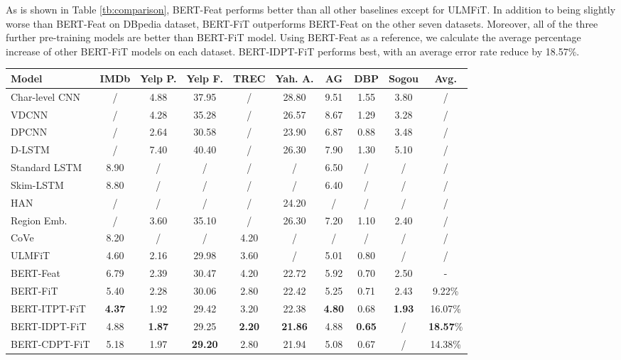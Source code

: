 \documentclass[11pt,a4paper]{article}
\theoremstyle{definition}
\begin{document}
\begin{CJK*}{UTF8}{gbsn}
	As is shown in Table \ref{tb:comparison}, BERT-Feat performs better than all other baselines except for ULMFiT. In addition to being slightly worse than BERT-Feat on DBpedia dataset, BERT-FiT outperforms BERT-Feat on the other seven datasets.
	Moreover, all of the three further pre-training models are better than BERT-FiT model. Using BERT-Feat as a reference, we calculate the average percentage increase of other BERT-FiT models on each dataset. BERT-IDPT-FiT performs best, with an average error rate reduce by 18.57\%.

	

\begin{table*}[h!]\small\setlength{\tabcolsep}{6pt}
		\centering
		\begin{tabular}{l c c c c c c c c c }
			\toprule
			Model & IMDb & Yelp P. & Yelp F. & TREC & Yah. A. & AG & DBP & Sogou & Avg.  \\
			\midrule
			Char-level CNN\cite{zhang2015character} & / & 4.88 & 37.95 & / & 28.80 & 9.51 & 1.55 & 3.80 & / \\
			VDCNN \cite{conneau2016very} & / & 4.28 & 35.28 & / & 26.57 & 8.67 & 1.29 & 3.28 & / \\
			DPCNN \cite{johnson2017deep} & / & 2.64 & 30.58 & / & 23.90 & 6.87 & 0.88 & 3.48 & / \\
			\midrule	
			D-LSTM \cite{yogatama2017generative} & / & 7.40 & 40.40 & / & 26.30 & 7.90 & 1.30 & 5.10 & / \\
			Standard LSTM \cite{seo2017neural} & 8.90 & / & / & / & / & 6.50 & / & / & / \\
			Skim-LSTM \cite{seo2017neural} & 8.80 & / & / & / & / & 6.40 & / & / & / \\
			HAN \cite{yang2016hierarchical} & / & / & / & / & 24.20 & / & / & / & / \\
			\midrule
			Region Emb. \cite{qiao2018anew} & / & 3.60 & 35.10 & / & 26.30 & 7.20 & 1.10 & 2.40 & / \\
			CoVe \cite{mccann2017learned} & 8.20 & / & / & 4.20 & / & / & / & / & / \\
			ULMFiT \cite{howard2018universal} & 4.60 & 2.16 & 29.98 & 3.60 & / & 5.01 & 0.80 & / & / \\
			\midrule
			BERT-Feat & 6.79 & 2.39 & 30.47 & 4.20 & 22.72 & 5.92 & 0.70 & 2.50 & - \\ BERT-FiT & 5.40 & 2.28 & 30.06 & 2.80 & 22.42 & 5.25 & 0.71 & 2.43 & 9.22\% \\  BERT-ITPT-FiT & \textbf{4.37} & 1.92 & 29.42 & 3.20 & 22.38 & \textbf{4.80} & 0.68 & \textbf{1.93} & 16.07\% \\ BERT-IDPT-FiT & 4.88 & \textbf{1.87} & 29.25 & \textbf{2.20} & \textbf{21.86} & 4.88 & \textbf{0.65} & / & \textbf{18.57}\% \\ BERT-CDPT-FiT & 5.18 & 1.97 & \textbf{29.20} & 2.80 & 21.94 & 5.08 & 0.67 & / & 14.38\% \\ \bottomrule

\end{tabular}
\end{table*}
\end{CJK*}
\end{document}
